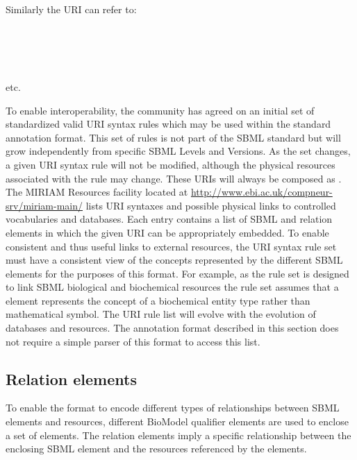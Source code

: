 Similarly the URI  can refer to:

\noindent {}\\
\noindent {}\\
\noindent {}\\
\noindent {}\\[1ex]
\noindent etc.

To enable interoperability, the community has agreed on an initial
set of standardized valid URI syntax rules which may be used
within the standard annotation format. This set of rules is not
part of the SBML standard but will grow independently from
specific SBML Levels and Versions. As the set changes, a given URI
syntax rule will not be modified, although the physical resources
associated with the rule may change. These URIs will always be
composed as . The MIRIAM Resources facility located at
\url{http://www.ebi.ac.uk/compneur-srv/miriam-main/} lists URI syntaxes and
possible physical links to controlled vocabularies and databases.
Each entry contains a list of SBML and relation elements in which
the given URI can be appropriately embedded. To enable consistent
and thus useful links to external resources, the URI syntax rule
set must have a consistent view of the concepts represented by the
different SBML elements for the purposes of this format.  For
example, as the rule set is designed to link SBML biological and
biochemical resources the rule set assumes that a \Species element
represents the concept of a biochemical entity type rather than
mathematical symbol. The URI rule list will evolve with the
evolution of databases and resources. The annotation format
described in this section does not require a simple parser of this
format to access this list.


\subsection{Relation elements}
\label{sec:qualified-dc-annotation}

To enable the format to encode different types of relationships
between SBML elements and resources, different BioModel qualifier
elements are used to enclose a set of  elements. The
relation elements imply a specific relationship between the
enclosing SBML element and the resources referenced by the
 elements.

